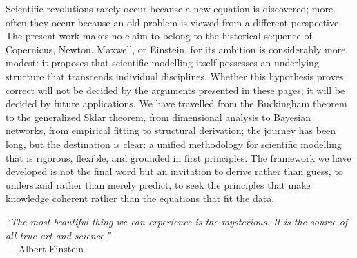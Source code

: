 Scientific revolutions rarely occur because a new equation is discovered; more often they occur because an old problem is viewed from a different perspective. The present work makes no claim to belong to the historical sequence of Copernicus, Newton, Maxwell, or Einstein, for its ambition is considerably more modest: it proposes that scientific modelling itself possesses an underlying structure that transcends individual disciplines. Whether this hypothesis proves correct will not be decided by the arguments presented in these pages; it will be decided by future applications. We have travelled from the Buckingham theorem to the generalized Sklar theorem, from dimensional analysis to Bayesian networks, from empirical fitting to structural derivation; the journey has been long, but the destination is clear: a unified methodology for scientific modelling that is rigorous, flexible, and grounded in first principles. The framework we have developed is not the final word but an invitation to derive rather than guess, to understand rather than merely predict, to seek the principles that make knowledge coherent rather than the equations that fit the data.

\vspace{1em}
\noindent\textit{``The most beautiful thing we can experience is the mysterious. It is the source of all true art and science.''} \\
\hfill --- Albert Einstein 